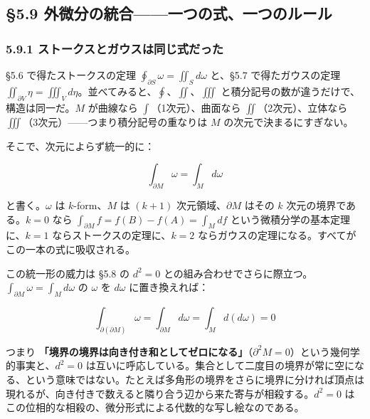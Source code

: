 \documentclass[a4paper,12pt,openany]{book}
\begin{document}
\par\vspace{0.35em}\par

\hypertarget{ux5916ux5faeux5206ux306eux7d71ux5408ux4e00ux3064ux306eux5f0fux4e00ux3064ux306eux30ebux30fcux30eb}{%
\subsection{§5.9
外微分の統合——一つの式、一つのルール}\label{ux5916ux5faeux5206ux306eux7d71ux5408ux4e00ux3064ux306eux5f0fux4e00ux3064ux306eux30ebux30fcux30eb}}

\hypertarget{ux30b9ux30c8ux30fcux30afux30b9ux3068ux30acux30a6ux30b9ux306fux540cux3058ux5f0fux3060ux3063ux305f}{%
\subsubsection{5.9.1
ストークスとガウスは同じ式だった}\label{ux30b9ux30c8ux30fcux30afux30b9ux3068ux30acux30a6ux30b9ux306fux540cux3058ux5f0fux3060ux3063ux305f}}

§5.6 で得たストークスの定理
\(\oint_{\partial S}\omega = \iint_S d\omega\) と、§5.7
で得たガウスの定理
\(\iint_{\partial V}\eta = \iiint_V d\eta\)。並べてみると、\(\oint\)、\(\iint\)、\(\iiint\)
と積分記号の数が違うだけで、構造は同一だ。\(M\) が曲線なら
\(\int\)（1次元）、曲面なら \(\iint\)（2次元）、立体なら
\(\iiint\)（3次元）——つまり積分記号の重なりは \(M\)
の次元で決まるにすぎない。

そこで、次元によらず統一的に：

\[\int_{\partial M} \omega = \int_M d\omega\]

と書く。\(\omega\) は \(k\)-form、\(M\) は \((k+1)\)
次元領域、\(\partial M\) はその \(k\) 次元の境界である。\(k=0\) なら
\(\int_{\partial M} f = f(B)-f(A) = \int_M df\)
という微積分学の基本定理に、\(k=1\) ならストークスの定理に、\(k=2\)
ならガウスの定理になる。すべてがこの一本の式に吸収される。

この統一形の威力は §5.8 の \(d^2=0\)
との組み合わせでさらに際立つ。\(\int_{\partial M} \omega = \int_M d\omega\)
の \(\omega\) を \(d\omega\) に置き換えれば：

\[\int_{\partial(\partial M)} \omega = \int_{\partial M} d\omega = \int_M d(d\omega) = 0\]

つまり
\textbf{「境界の境界は向き付き和としてゼロになる」}（\(\partial^2 M = 0\)）という幾何学的事実と、\textbf{$d^2=0$}
は互いに呼応している。集合として二度目の境界が常に空になる、という意味ではない。たとえば多角形の境界をさらに境界に分ければ頂点は現れるが、向き付きで数えると隣り合う辺から来た寄与が相殺する。\(d^2=0\)
はこの位相的な相殺の、微分形式による代数的な写し絵なのである。
\end{document}
